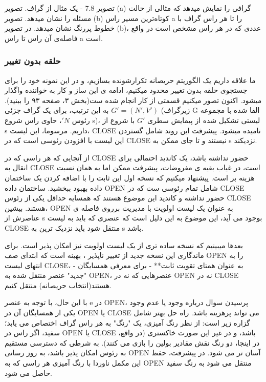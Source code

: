 \documentclass{book} %
\begin{document}
تصویر 7.8 - یک مثال از گراف. تصویر (a) گرافی را نمایش میدهد که مثالی از حالت مسئله را نشان میدهد.  تصویر (b) کوتاه‌ترین مسیر راس a را تا هر راس گراف با خطوط پررنگ نشان میدهد. در تصویر (b)، عددی که در هر راس مشخص است در واقع فاصله‌ی آن راس تا راس a است.



\newpage
\subsubsection*{حلقه بدون تغییر}

ما علاقه داریم یک الگوریتم حریصانه تکرارشونده بسازیم، و در این نمونه خود را برای جستجوی حلقه بدون تغییر محدود میکنیم، ادامه ی این ساز و کار به خواننده واگذار میشود. اکنون تصور میکنیم قسمتی از کار انجام شده ست(بخش ۳، صفحه ۹۳ را ببنید). به این ترتیب، برای یک گراف جزئی $G′ = (N′, V′)$ (زیرگراف G القا شده با مجموعه رئوس $'N$، حاوی راس شروع s)، لیستی تشکیل شده از پیمایش سطری $G'$ با شروع از s داریم.
مرسوما، این لیست، CLOSE نامیده میشود. پیشرفت این روند شامل گستردن این لیست با افزودن رئوسی است که در CLOSE نیستند و تا جای ممکن به s نزدیکند.


از آنجایی که هر راسی که در CLOSE حضور نداشته باشد، یک کاندید احتمالی برای انقال به CLOSE است، در غیاب بقیه ی مفروضات، پیشرفت ممکن اما به همان نسبت هزینه بر است.
پیشنهاد میکنیم که نسخه اول این ثابت را با اضافه کردن یک ساختمان داده بهبود ببخشید. ساختمان داده OPEN شامل تمام رئوسی ست که در CLOSE حضور نداشته و کاندید این موضوع هستند که همسایه حداقل یکی از رئوس CLOSE هستند.
بیشین، OPEN به عنوان یک لیست اولویت با مدیریت برروی فاصله ی عناصرش از ‌s بوجود می آید، این موضوع به این دلیل است که عنصری که باید به لیست CLOSE منتقل شود باید نزدیک ترین به s باشد.


بعدها میبینیم که نسخه ساده تری از یک لیست اولویت نیز امکان پذیر است. برای ماندگاری این نسخه جدید از تغییر ناپذیر ، بهینه است که ابتدای صف OPEN را به انتهای لیست CLOSE، - به عنوان همتای تقویت ثابت** - برای معرفی همسایگان "جدید" عنصر منتقل شده به OPEN، عنصرهایی که نه در OPEN نه در CLOSE هستند(انتخاب حریصانه) منتقل کنیم.

با این حال، با توجه به عنصر e در OPEN، پرسیدن سوال درباره وجود یا عدم وجود یکی از همسایگان آن در OPEN یا CLOSE می تواند پرهزینه باشد. راه حل بهتر شامل گزاره زیر است: از نظر رنگ آمیزی، یک "رنگ" به هر راس گراف اختصاص می یابد؛ سفید، اگر راس در OPEN یا CLOSE باشد، و در غیر این صورت خاکستری (در واقع، در اینجا، دو رنگ نقش مقادیر بولین را بازی می کنند). به شرطی که دسترسی مستقیم به رئوس امکان پذیر باشد، به روز رسانی OPEN آسان تر می شود. در پیشرفت، حفظ این مکمل ناوردا با رنگ آمیزی هر راسی که به OPEN منتقل می شود به رنگ سفید حاصل می شود.
\end{document}
